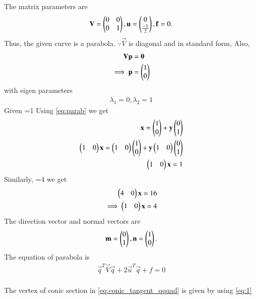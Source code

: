 \documentclass[journal,12pt,twocolumn]{IEEEtran}
\begin{document}
The matrix parameters  are
\begin{align}
\mathbf{V} = \begin{pmatrix}0 & 0\\0 & 1\end{pmatrix}, \mathbf{u} = \begin{pmatrix}0\\\frac{-1}{2}\end{pmatrix}, \mathbf{f}=0.
\label{eq:parab_twovar_params}
\end{align}
Thus, the given curve is a parabola.  $\because \vec{V}$ is diagonal and in standard form,
Also, 
\begin{align}
\mathbf{V}\mathbf{p} &= \mathbf{0}
\\
\implies \mathbf{p} &= \begin{pmatrix}1\\0\end{pmatrix}
\label{eq:parab_twovar_p}
\end{align}
with eigen parameters\\
\begin{align}
\lambda_1=0, \lambda_2=1
\end{align}
Given =1  Using \eqref{eq:parab} we get
\begin{align}
\mathbf{x}=\begin{pmatrix}1\\0\end{pmatrix}+\mathbf{y}\begin{pmatrix}0\\1\end{pmatrix}\\
\begin{pmatrix}1 & 0\end{pmatrix}\mathbf{x}=\begin{pmatrix}1 & 0\end{pmatrix}\begin{pmatrix}1\\0\end{pmatrix}+\mathbf{y}\begin{pmatrix}1 & 0\end{pmatrix}\begin{pmatrix}0\\1\end{pmatrix}\\
\begin{pmatrix}1 & 0\end{pmatrix}\mathbf{x}=1\label{eq:line1}
\end{align}
Similarly, =4 we get
\begin{align}\label{eq:line2}
\begin{pmatrix}4 & 0\end{pmatrix}\mathbf{x}=16\\
\implies\begin{pmatrix}1 & 0\end{pmatrix}\mathbf{x}=4
\end{align}
The direction vector and normal vectors are
\begin{align}
\mathbf{m} = \begin{pmatrix}0\\1\end{pmatrix}, \mathbf{n} = \begin{pmatrix}1\\0\end{pmatrix}.
\label{eq:parab_twovar_mn}
\end{align}
The equation of parabola is
\begin{align}
\vec{q}^T\vec{V}\vec{q} + 2\vec{u}^T\vec{q} +f = 0
\label{eq:conic_tangent_qquad}
\end{align}\\
The vertex of conic section in \eqref{eq:conic_tangent_qquad} is given by  using  \eqref{eq:1} 
\end{document}
